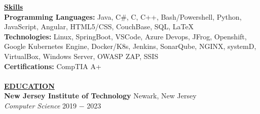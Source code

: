 \documentclass{article}
\begin{document}
\noindent \textbf{\underline{Skills}} \\
\noindent \textbf{Programming Languages: } Java, C\#, C, C++, Bash/Powershell, Python, JavaScript, Angular, HTML5/CSS, CouchBase, SQL, \LaTeX\\
\noindent \textbf{Technologies: } Linux, SpringBoot, VSCode, Azure Devops, JFrog, Openshift, Google Kubernetes Engine, Docker/K8s, Jenkins, SonarQube, NGINX, systemD, VirtualBox, Windows Server, OWASP ZAP, SSIS\\
\noindent \textbf{Certifications: } CompTIA A+\\ \\
\noindent \textbf{\underline{EDUCATION}} \\
\textbf{New Jersey Institute of Technology} \hfill Newark, New Jersey \\
\textit{Computer Science}  \hfill \hfill 2019 $-$ 2023 \\
\end{document}
